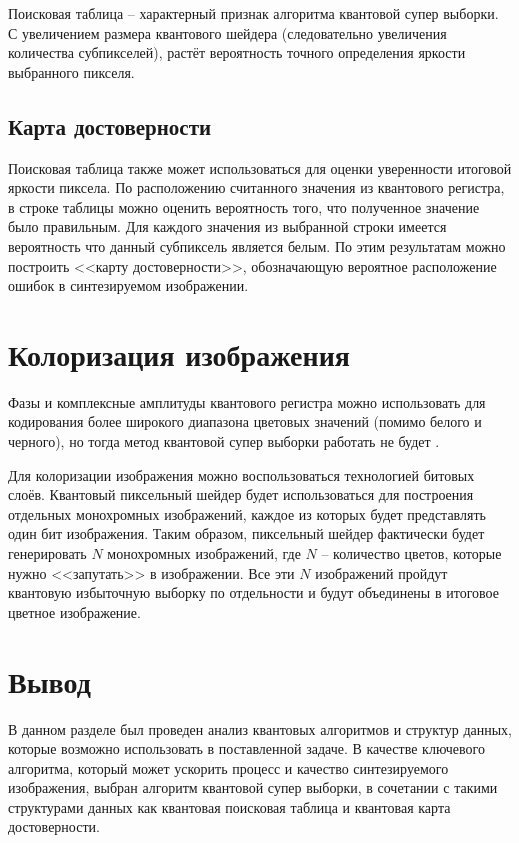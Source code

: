 Поисковая таблица -- характерный признак алгоритма квантовой супер выборки. С увеличением размера квантового шейдера (следовательно увеличения количества субпикселей), растёт вероятность точного определения яркости выбранного пикселя.

\subsection{Карта достоверности}

Поисковая таблица также может использоваться для оценки уверенности итоговой яркости пиксела. По расположению считанного значения из квантового регистра, в строке таблицы можно оценить вероятность того, что полученное значение было правильным. Для каждого значения из выбранной строки имеется вероятность что данный субпиксель является белым. По этим результатам можно построить <<карту достоверности>>, обозначающую вероятное расположение ошибок в синтезируемом изображении.

\section{Колоризация изображения}

Фазы и комплексные амплитуды квантового регистра можно использовать для кодирования более широкого диапазона цветовых значений (помимо белого и черного), но тогда метод квантовой супер выборки работать не будет \cite{PQC}. 

Для колоризации изображения можно воспользоваться технологией битовых слоёв. Квантовый пиксельный шейдер будет использоваться для построения отдельных монохромных изображений, каждое из которых будет представлять один бит изображения. Таким образом, пиксельный шейдер фактически будет генерировать $N$ монохромных изображений, где $N$ -- количество цветов, которые нужно <<запутать>> в изображении. Все эти $N$ изображений пройдут квантовую избыточную выборку по отдельности и будут объединены в итоговое цветное изображение.

\section*{Вывод}

В данном разделе был проведен анализ квантовых алгоритмов и структур данных, которые возможно использовать в поставленной задаче. В качестве ключевого алгоритма, который может ускорить процесс и качество синтезируемого изображения, выбран алгоритм квантовой супер выборки, в сочетании с такими структурами данных как квантовая поисковая таблица и квантовая карта достоверности.